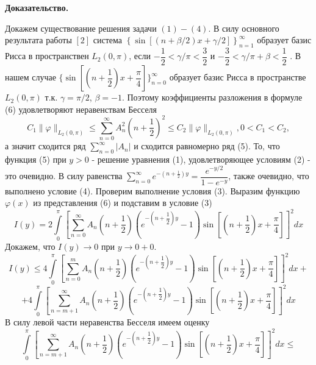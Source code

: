 \documentclass[12pt, a4paper]{article}
\begin{document}
\textbf{Доказательство.} 

	
	Докажем существование решения задачи $(1) - (4)$. В силу основного результата работы $[2]$ система $\left\{\sin\left[\left(n+\beta/2\right)x + \gamma/2\right]\right\}_{n=1}^{\infty}$ образует базис Рисса в пространствен $L_2(0,\pi)$, если $-\dfrac12 < \gamma/\pi < \dfrac32$ и $-\dfrac32 < \gamma/\pi + \beta < \dfrac12$ . В нашем случае $\{\sin{\left[\left(n + \dfrac12\right)x + \dfrac\pi4\right]}\}_{n=0}^{\infty}$ образует базис Рисса в пространстве $L_2(0, \pi)$ т.к. $\gamma = \pi/2$, $\beta=-1$. Поэтому коэффициенты разложения в формуле (6) удовлетворяют неравенствам Бесселя
	\begin{equation*}
		C_1 \|\varphi \|_{L_2(0,\pi)} \leq \sum\limits_{n=0}^{\infty} A_n^2 \left(n + \dfrac12\right)^2 \leq C_2 \|\varphi \|_{L_2(0,\pi)} , 0 < C_1 < C_2, 
	\end{equation*}
	а значит сходится ряд $\sum\limits_{n=0}^{\infty} |A_n|$ и сходится равномерно ряд (5). То, что функция (5) при $y > 0$ - решение уравнения (1), удовлетворяющее условиям (2) - это очевидно. В силу равенства $\sum\limits_{n=0}^{\infty} e^{-\left(n + \frac12\right)y} = \dfrac{e^{-y/2}}{1 - e^{-y}}$, также очевидно, что выполнено условие (4). Проверим выполнение условия (3).\newline
	Выразим функцию $\varphi(x)$ из представления (6) и подставим в условие (3)
	\begin{equation*}
		I(y) =  2 \int\limits_0^\pi \left[	\sum\limits_{n=0}^{\infty} A_n\left(n+\dfrac12\right) \left( e^{-\left(n+\dfrac12\right)y} - 1\right) \sin{\left[\left(n+\dfrac12\right) x  + \dfrac\pi4\right]} \right]^2 dx
	\end{equation*}
	Докажем, что $I(y) \to 0$ при $y \to 0+0$. 
	\begin{equation*}
		I(y) \leq 4\int\limits_0^\pi \left[	\sum\limits_{n=0}^{m} A_n\left(n+\dfrac12\right) \left( e^{-\left(n+\dfrac12\right)y} - 1\right) \sin{\left[\left(n+\dfrac12\right) x  + \dfrac\pi4\right]} \right]^2 dx + 
	\end{equation*}
	\begin{equation*}
		+ 4\int\limits_0^\pi \left[	\sum\limits_{n=m+1}^{\infty} A_n\left(n+\dfrac12\right) \left( e^{-\left(n+\dfrac12\right)y} - 1\right) \sin{\left[\left(n+\dfrac12\right) x  + \dfrac\pi4\right]} \right]^2 dx
	\end{equation*}
	В силу левой части неравенства Бесселя имеем оценку
	\begin{equation*}
		\int\limits_0^\pi \left[	\sum\limits_{n=m+1}^{\infty} A_n\left(n+\dfrac12\right) \left( e^{-\left(n+\dfrac12\right)y} - 1\right) \sin{\left[\left(n+\dfrac12\right) x  + \dfrac\pi4\right]} \right]^2 dx \leq 
	\end{equation*}
\end{document}
